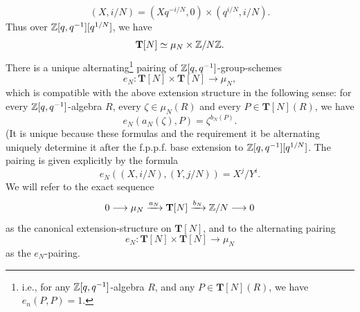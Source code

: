 \begin{equation}\label{eq:8.7.1.5}
(X, i/N) = (Xq^{-i/N}, 0) \times (q^{i/N}, i/N) .
\end{equation}
Thus over $\mathbb{Z}[q,q^{-1}][q^{1/N}]$, we have
\begin{equation}\label{eq:8.7.1.6}
\mathbf{T}[N] \simeq \mu_N \times \mathbb{Z}/N\mathbb{Z} .
\end{equation}
There is a unique alternating\footnote{i.e., for any $\mathbb{Z}[q,q^{-1}]$-algebra $R$, and any $P \in \mathbf{T}[N](R)$, we have $e_n(P,P) = 1$.} pairing of $\mathbb{Z}[q,q^{-1}]$-group-schemes
\begin{equation}\label{eq:8.7.1.7}
e_N : \mathbf{T}[N] \times \mathbf{T}[N] \to \mu_N ,
\end{equation}
which is compatible with the above extension structure in the following sense: for every $\mathbb{Z}[q,q^{-1}]$-algebra $R$, every $\zeta \in \mu_N(R)$ and every $P \in \mathbf{T}[N](R)$, we have
\begin{equation}\label{eq:8.7.1.8}
e_N(a_N(\zeta), P) = \zeta^{b_N(P)} .
\end{equation}
(It is unique because these formulas and the requirement it be alternating uniquely determine it after the f.p.p.f. base extension to $\mathbb{Z}[q,q^{-1}][q^{1/N}]$. The pairing is given explicitly by the formula
\begin{equation}\label{eq:8.7.1.9}
e_N((X, i/N), (Y, j/N)) = X^j / Y^i .
\end{equation}
We will refer to the exact sequence
\begin{equation}\label{eq:8.7.1.10}
0 \longrightarrow \mu_N \xrightarrow{a_N} \mathbf{T}[N] \xrightarrow{b_N} \mathbb{Z}/N \longrightarrow 0
\end{equation}
as the canonical extension-structure on $\mathbf{T}[N]$, and to the alternating pairing
\[
e_N : \mathbf{T}[N] \times \mathbf{T}[N] \to \mu_N
\]
as the $e_N$-pairing.

